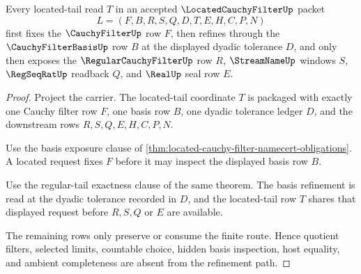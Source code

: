 \begin{theorem}
\label{thm:located-cauchy-filter-basis-refinement-route}
Every located-tail read $T$ in an accepted $\LocatedCauchyFilterUp$ packet
$$
L=(F,B,R,S,Q,D,T,E,H,C,P,N)
$$
first fixes the $\CauchyFilterUp$ row $F$, then refines through the $\CauchyFilterBasisUp$ row $B$ at the displayed dyadic tolerance $D$, and only then exposes the $\RegularCauchyFilterUp$ row $R$, $\StreamNameUp$ windows $S$, $\RegSeqRatUp$ readback $Q$, and $\RealUp$ seal row $E$.
\end{theorem}
\begin{proof}
Project the carrier. The located-tail coordinate $T$ is packaged with exactly one Cauchy filter row $F$, one basis row $B$, one dyadic tolerance ledger $D$, and the downstream rows $R,S,Q,E,H,C,P,N$.

Use the basis exposure clause of \autoref{thm:located-cauchy-filter-namecert-obligations}. A located request fixes $F$ before it may inspect the displayed basis row $B$.

Use the regular-tail exactness clause of the same theorem. The basis refinement is read at the dyadic tolerance recorded in $D$, and the located-tail row $T$ shares that displayed request before $R,S,Q$ or $E$ are available.

The remaining rows only preserve or consume the finite route. Hence quotient filters, selected limits, countable choice, hidden basis inspection, host equality, and ambient completeness are absent from the refinement path.
\end{proof}

